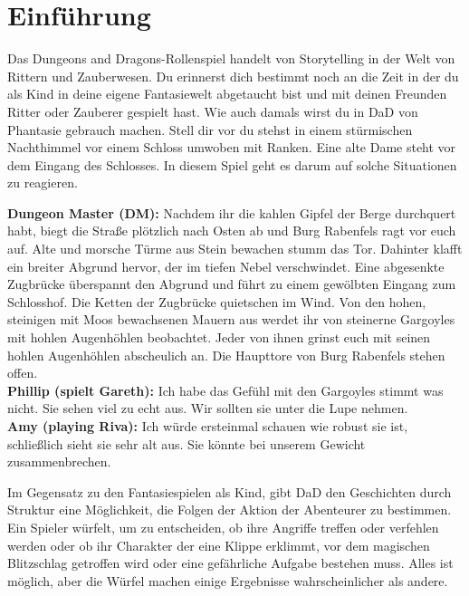 \chapter{Einführung}
Das Dungeons and Dragons-Rollenspiel handelt von Storytelling in der Welt von Rittern und Zauberwesen. Du erinnerst dich bestimmt noch an die Zeit in der du als Kind in deine eigene Fantasiewelt abgetaucht bist und mit deinen Freunden Ritter oder Zauberer gespielt hast. Wie auch damals wirst du in  DaD von Phantasie gebrauch machen. Stell dir vor du stehst in einem stürmischen Nachthimmel vor einem Schloss umwoben mit Ranken. Eine alte Dame steht vor dem Eingang des Schlosses. In diesem Spiel geht es darum auf solche Situationen zu reagieren.

\begin{quotebox}
\textbf{Dungeon Master (DM):}
Nachdem ihr die kahlen Gipfel der Berge durchquert habt, biegt die Straße plötzlich nach Osten ab und Burg Rabenfels ragt vor euch auf. Alte und morsche Türme aus Stein bewachen stumm das Tor. Dahinter klafft ein breiter Abgrund hervor, der im tiefen Nebel verschwindet. Eine abgesenkte Zugbrücke überspannt den Abgrund und führt zu einem gewölbten Eingang zum Schlosshof. Die Ketten der Zugbrücke quietschen im Wind. Von den hohen, steinigen mit Moos bewachsenen Mauern aus werdet ihr von steinerne Gargoyles mit hohlen Augenhöhlen beobachtet. Jeder von ihnen grinst euch mit seinen hohlen Augenhöhlen abscheulich an.  Die Haupttore von Burg Rabenfels stehen offen.\\
\textbf{Phillip (spielt Gareth):} Ich habe das Gefühl mit den Gargoyles stimmt was nicht. Sie sehen viel zu echt aus. Wir sollten sie unter die Lupe nehmen.\\
\textbf{Amy (playing Riva):} Ich würde ersteinmal schauen wie robust sie ist, schließlich sieht sie sehr alt aus. Sie könnte bei unserem Gewicht zusammenbrechen.
\end{quotebox}

Im Gegensatz zu den Fantasiespielen als Kind, gibt DaD den Geschichten durch Struktur eine Möglichkeit, die Folgen der Aktion der Abenteurer zu bestimmen. Ein Spieler würfelt, um zu entscheiden, ob ihre Angriffe treffen oder verfehlen werden oder ob ihr Charakter der eine Klippe erklimmt, vor dem magischen Blitzschlag getroffen wird oder eine gefährliche Aufgabe bestehen muss. Alles ist möglich, aber die Würfel machen einige Ergebnisse wahrscheinlicher als andere.

